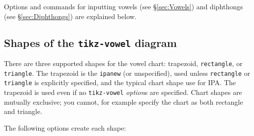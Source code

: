 \documentclass{article}
\newcommand{\pkg}[1]{\texttt{#1}}
\begin{document}
\medskip

Options and commands for inputting vowels (see \S \ref{sec:Vowels}) and diphthongs (see \S \ref{sec:Diphthongs}) are explained below.

\subsection{Shapes of the \pkg{tikz-vowel} diagram}
\label{sec:Shapes of the tikz-vowel diagram}

There are three supported shapes for the vowel chart: trapezoid, \texttt{rectangle}, or \texttt{triangle}.  The  trapezoid is the \texttt{ipanew} (or unspecified), used unless \texttt{rectangle} or \texttt{triangle} is explicitly specified, and the typical chart shape use for IPA.  The trapezoid is used even if no \texttt{tikz-vowel} \textit{option}s are specified.  Chart shapes are mutually exclusive; you cannot, for example specify the chart as both rectangle and triangle.

\bigskip
\noindent
The following options create each shape:
\end{document}
